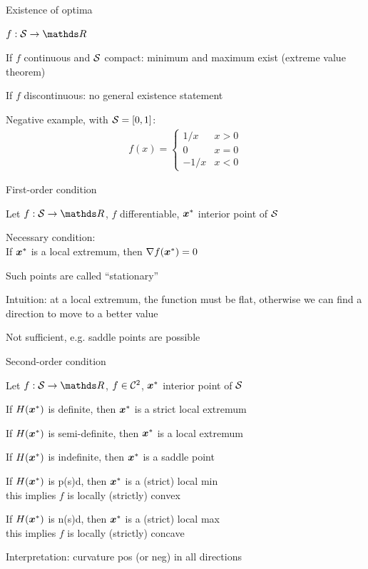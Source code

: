 \documentclass[11pt,compress,t,notes=noshow, xcolor=table]{beamer}
\begin{document}
\begin{framei}{Existence of optima}
\item $f: \S \to \R$
\item If $f$ continuous and $\S$ compact: minimum and maximum exist (extreme value theorem)
\item If $f$ discontinuous: no general existence statement
\item Negative example, with $\S = [0,1]$:
\begin{align*}
f(x) = \begin{cases}
1/x  & x > 0 \\
0    & x = 0 \\
-1/x & x < 0
\end{cases}
\end{align*}
\end{framei}


\begin{framei}{First-order condition}
\item Let $f: \S \to \R$, $f$ differentiable, $\xvs$ interior point of $\S$
\item Necessary condition:\\
If $\xvs$ is a local extremum, then $\nabla \fxvs = 0$
\item Such points are called ``stationary''
\item Intuition: at a local extremum, the function must be flat, otherwise we can find a direction to move to a better value
\item Not sufficient, e.g. saddle points are possible
\vfill
{}
\end{framei}

\begin{framei}[fs=footnotesize]{Second-order condition}
\item Let $f: \S \to \R$, $f \in \CC{2}$, $\xvs$ interior point of $\S$
\item If $H(\xvs)$ is definite, then $\xvs$ is a strict local extremum
\item If $H(\xvs)$ is semi-definite, then $\xvs$ is a local extremum
\item If $H(\xvs)$ is indefinite, then $\xvs$ is a saddle point
\item If $H(\xvs)$ is p(s)d, then $\xvs$ is a (strict) local min\\
this implies $f$ is locally (strictly) convex
\item If $H(\xvs)$ is n(s)d, then $\xvs$ is a (strict) local max\\
this implies $f$ is locally (strictly) concave
\item Interpretation: curvature pos (or neg) in all directions
\end{framei}
\end{document}
